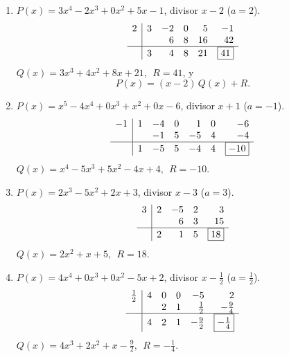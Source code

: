 \documentclass[14pt]{extarticle}
\begin{document}
	\begin{enumerate}[label=(\arabic*), start=5]
		\item \(P(x)=3x^{4}-2x^{3}+0x^{2}+5x-1\), divisor \(x-2\) (\(a=2\)).
		\[
		\begin{array}{r|rrrrr}
			2 & 3 & -2 & 0 & 5 & -1\\
			&   &  6 & 8 & 16 & 42\\ \hline
			& 3 &  4 & 8 & 21 & \boxed{41}
		\end{array}
		\]
		\(\boxed{Q(x)=3x^{3}+4x^{2}+8x+21,\ \ R=41}\), y
		\[
		P(x)=(x-2)\,Q(x)+R.
		\]
		
		\item \(P(x)=x^{5}-4x^{4}+0x^{3}+x^{2}+0x-6\), divisor \(x+1\) (\(a=-1\)).
		\[
		\begin{array}{r|rrrrrr}
			-1 & 1 & -4 & 0 & 1 & 0 & -6\\
			&   & -1 & 5 & -5& 4 & -4\\ \hline
			& 1 & -5 & 5 & -4& 4 & \boxed{-10}
		\end{array}
		\]
		\(\boxed{Q(x)=x^{4}-5x^{3}+5x^{2}-4x+4,\ \ R=-10}\).
		
		\item \(P(x)=2x^{3}-5x^{2}+2x+3\), divisor \(x-3\) (\(a=3\)).
		\[
		\begin{array}{r|rrrr}
			3 & 2 & -5 & 2 & 3\\
			&   &  6 & 3 & 15\\ \hline
			& 2 &  1 & 5 & \boxed{18}
		\end{array}
		\]
		\(\boxed{Q(x)=2x^{2}+x+5,\ \ R=18}\).
		
		\item \(P(x)=4x^{4}+0x^{3}+0x^{2}-5x+2\), divisor \(x-\tfrac{1}{2}\) (\(a=\tfrac12\)).
		\[
		\begin{array}{r|rrrrr}
			\tfrac12 & 4 & 0 & 0 & -5 & 2\\
			&   & 2 & 1 & \tfrac12 & -\tfrac{9}{4}\\ \hline
			& 4 & 2 & 1 & -\tfrac{9}{2} & \boxed{-\tfrac14}
		\end{array}
		\]
		\(\boxed{Q(x)=4x^{3}+2x^{2}+x-\tfrac{9}{2},\ \ R=-\tfrac14}\).
	\end{enumerate}
	
\end{document}
